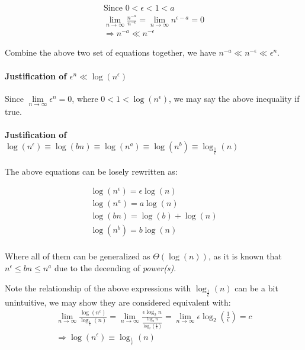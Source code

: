 \documentclass[12pt]{article}
\begin{document}
\begin{gather}
    \text{Since } 0 < \epsilon < 1 < a \\
    \lim\limits_{n \to \infty} \frac{n^{-a}}{n^{-\epsilon}} = \lim\limits_{n \to \infty} n^{\epsilon - a} = 0 \\
    \Longrightarrow n^{-a} \ll n^{-\epsilon}
\end{gather}

Combine the above two set of equations together, we have $n^{-a} \ll n^{-\epsilon} \ll \epsilon^n$.

\paragraph{Justification of $\epsilon^n \ll \log(n^\epsilon)$\newline}

Since $\lim\limits_{n \to \infty} \epsilon^n = 0$, where $0 < 1 < \log(n^\epsilon)$, we may say the above inequality if true.


\paragraph{Justification of $\log(n^\epsilon) \equiv \log(bn) \equiv \log(n^a) \equiv \log(n^b) \equiv \log_{\frac{1}{\epsilon}}(n)$\newline}

The above equations can be losely rewritten as:

\begin{gather}
    \log(n^\epsilon) = \epsilon \log(n) \\
    \log(n^a) = a \log(n) \\
    \log(bn) = \log(b) + \log(n) \\
    \log(n^b) = b \log(n) \\
\end{gather}

Where all of them can be generalized as $\Theta(\log(n))$, as it is known that $n^\epsilon \leq bn \leq n^a$ due to the decending of \textit{power(s)}.\newline

Note the relationship of the above expressions with $\log_{\frac{1}{\epsilon}}(n)$ can be a bit unintuitive, we may show they are considered equivalent with:
\begin{gather}
    \lim\limits_{n \to \infty} \frac{\log(n^\epsilon)}{\log_{\frac{1}{\epsilon}}(n)} = \lim\limits_{n \to \infty} \frac{\epsilon \log_{2}n}{\frac{\log_{2}n}{\log_{2}(\frac{1}{\epsilon})}} = \lim\limits_{n \to \infty} \epsilon \log_2(\frac{1}{\epsilon}) = c \nonumber\\
    \Rightarrow \log(n^\epsilon) \equiv \log_{\frac{1}{\epsilon}}(n)
\end{gather}
\end{document}

